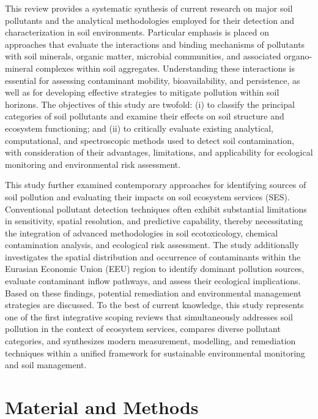 \documentclass[sn-mathphys-num]{sn-jnl}
\begin{document}
This review provides a systematic synthesis of current research on major soil pollutants and the analytical methodologies employed for their detection and characterization in soil environments. Particular emphasis is placed on approaches that evaluate the interactions and binding mechanisms of pollutants with soil minerals, organic matter, microbial communities, and associated organo-mineral complexes within soil aggregates. Understanding these interactions is essential for assessing contaminant mobility, bioavailability, and persistence, as well as for developing effective strategies to mitigate pollution within soil horizons. The objectives of this study are twofold: (i) to classify the principal categories of soil pollutants and examine their effects on soil structure and ecosystem functioning; and (ii) to critically evaluate existing analytical, computational, and spectroscopic methods used to detect soil contamination, with consideration of their advantages, limitations, and applicability for ecological monitoring and environmental risk assessment.

This study further examined contemporary approaches for identifying sources of soil pollution and evaluating their impacts on soil ecosystem services (SES). Conventional pollutant detection techniques often exhibit substantial limitations in sensitivity, spatial resolution, and predictive capability, thereby necessitating the integration of advanced methodologies in soil ecotoxicology, chemical contamination analysis, and ecological risk assessment. The study additionally investigates the spatial distribution and occurrence of contaminants within the Eurasian Economic Union (EEU) region to identify dominant pollution sources, evaluate contaminant inflow pathways, and assess their ecological implications. Based on these findings, potential remediation and environmental management strategies are discussed. To the best of current knowledge, this study represents one of the first integrative scoping reviews that simultaneously addresses soil pollution in the context of ecosystem services, compares diverse pollutant categories, and synthesizes modern measurement, modelling, and remediation techniques within a unified framework for sustainable environmental monitoring and soil management.


\section{Material and Methods}\label{sec2}
\end{document}
